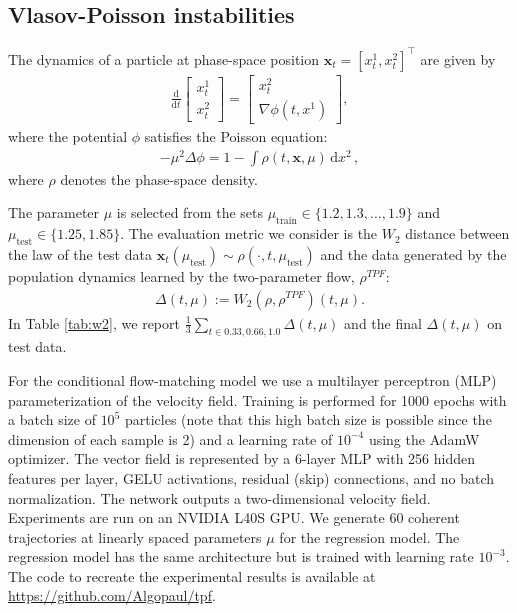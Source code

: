\documentclass{article}
\newcommand{\bfx}{\boldsymbol{x}}
\theoremstyle{definition}
\theoremstyle{plain}
\theoremstyle{definition}
\theoremstyle{remark}
\begin{document}
\subsection{Vlasov-Poisson instabilities}\label{appendix:Vlasov}
The dynamics of a particle at phase-space position $\bfx_t = [x^1_t, x^2_t]^\top$ are given by
\begin{align}
    \frac{\mathrm d}{\mathrm dt} \begin{bmatrix}
        x^1_t \\ x^2_t
    \end{bmatrix}
    = 
    \begin{bmatrix}
        x^2_t \\ \nabla \phi(t, x^1)
    \end{bmatrix},
\end{align}
where the potential $\phi$ satisfies the Poisson equation:
\begin{align}
    - \mu^2 \Delta \phi = 1 - \int \rho(t, \bfx, \mu) \, \mathrm dx^2\,,
\end{align}
where $\rho$ denotes the phase-space density. 


The parameter $\mu$ is selected from the sets $\mu_{\text{train}} \in \{ 1.2, 1.3, \dots, 1.9 \}$ and $\mu_{\text{test}} \in \{ 1.25, 1.85 \}$. The evaluation metric we consider is the $W_2$ distance between the law of the test data $\bfx_t(\mu_{\text{test}}) \sim \rho(\cdot, t, \mu_{\text{test}})$ and the data generated by the population dynamics learned by the two-parameter flow, $\rho^{TPF}$:
\begin{align}\label{eq:W2ErrorAppendixVlasov}
    \Delta(t, \mu) := W_2(\rho, \rho^{TPF})(t, \mu).
\end{align}
In Table \ref{tab:w2}, we report $\frac 1 3 \sum_{t \in {0.33, 0.66, 1.0}} \Delta(t, \mu)$ and the final $\Delta(t, \mu)$ on test data.

For the conditional flow-matching model we use a multilayer perceptron (MLP) parameterization of the velocity field. Training is performed for 1000 epochs with a batch size of 
$10^5$ particles (note that this high batch size is possible since the dimension of each sample is 2) and a learning rate of  $10^{-4}$ using the AdamW optimizer. The vector field is represented by a 6-layer MLP with 256 hidden features per layer, GELU activations, residual (skip) connections, and no batch normalization. The network outputs a two-dimensional velocity field. Experiments are run on an NVIDIA L40S GPU. We generate 60 coherent trajectories at linearly spaced parameters $\mu$ for the regression model. The regression model has the same architecture but is trained with learning rate $10^{-3}$. The code to recreate the experimental results is available at \url{https://github.com/Algopaul/tpf}.
\end{document}

